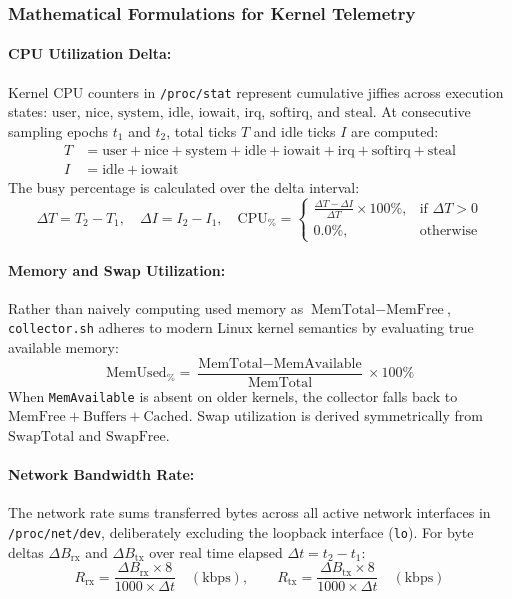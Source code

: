 \subsubsection{Mathematical Formulations for Kernel Telemetry}
\paragraph{CPU Utilization Delta:}
Kernel CPU counters in \texttt{/proc/stat} represent cumulative jiffies across execution states: $\text{user}$, $\text{nice}$, $\text{system}$, $\text{idle}$, $\text{iowait}$, $\text{irq}$, $\text{softirq}$, and $\text{steal}$. At consecutive sampling epochs $t_1$ and $t_2$, total ticks $T$ and idle ticks $I$ are computed:
\begin{align}
    T &= \text{user} + \text{nice} + \text{system} + \text{idle} + \text{iowait} + \text{irq} + \text{softirq} + \text{steal} \\
    I &= \text{idle} + \text{iowait}
\end{align}
The busy percentage is calculated over the delta interval:
\begin{equation}
    \Delta T = T_2 - T_1, \quad \Delta I = I_2 - I_1, \quad \text{CPU}_{\%} = 
    \begin{cases} 
        \frac{\Delta T - \Delta I}{\Delta T} \times 100\%, & \text{if } \Delta T > 0 \\ 
        0.0\%, & \text{otherwise} 
    \end{cases}
\end{equation}

\paragraph{Memory and Swap Utilization:}
Rather than naively computing used memory as $\text{MemTotal} - \text{MemFree}$, \texttt{collector.sh} adheres to modern Linux kernel semantics by evaluating true available memory:
\begin{equation}
    \text{MemUsed}_{\%} = \frac{\text{MemTotal} - \text{MemAvailable}}{\text{MemTotal}} \times 100\%
\end{equation}
When \texttt{MemAvailable} is absent on older kernels, the collector falls back to $\text{MemFree} + \text{Buffers} + \text{Cached}$. Swap utilization is derived symmetrically from $\text{SwapTotal}$ and $\text{SwapFree}$.

\paragraph{Network Bandwidth Rate:}
The network rate sums transferred bytes across all active network interfaces in \texttt{/proc/net/dev}, deliberately excluding the loopback interface (\texttt{lo}). For byte deltas $\Delta B_{\text{rx}}$ and $\Delta B_{\text{tx}}$ over real time elapsed $\Delta t = t_2 - t_1$:
\begin{equation}
    R_{\text{rx}} = \frac{\Delta B_{\text{rx}} \times 8}{1000 \times \Delta t} \quad (\text{kbps}), \qquad R_{\text{tx}} = \frac{\Delta B_{\text{tx}} \times 8}{1000 \times \Delta t} \quad (\text{kbps})
\end{equation}

